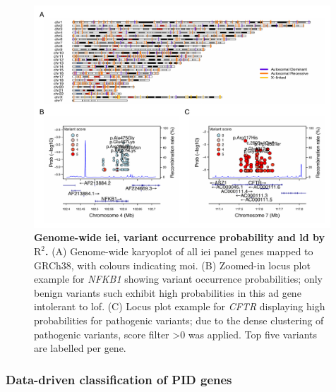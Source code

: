 \begin{figure}[ht]
  \centering
  \includegraphics[width=0.99\textwidth]{../images/karyo_locusplot_merged.pdf}
  \caption{\textbf{Genome-wide \ac{iei}, variant occurrence probability and \ac{ld} by $\text{R}^2$.} (A) Genome-wide karyoplot of all \ac{iei} panel genes mapped to GRCh38, with colours indicating \ac{moi}. (B) Zoomed-in locus plot example for \textit{NFKB1} showing variant occurrence probabilities; only benign variants such exhibit high probabilities in this \ac{ad} gene intolerant to \ac{lof}. (C) Locus plot example for \textit{CFTR} displaying high probabilities for pathogenic variants; due to the dense clustering of pathogenic variants, score filter >0 was applied. Top five variants are labelled per gene.}
  \label{fig:karyo_locusplot_merged}
\end{figure}


\subsubsection*{Data-driven classification of PID genes}

